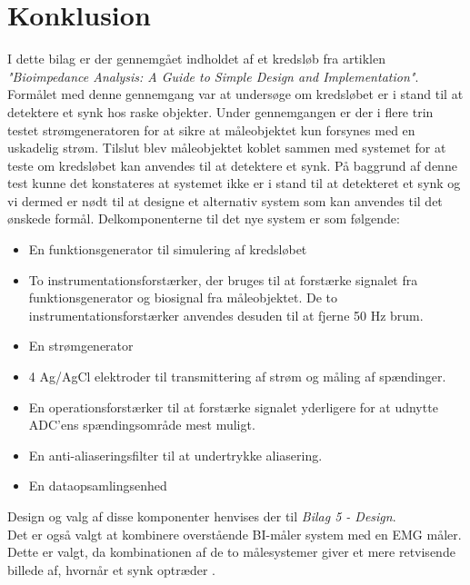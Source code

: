  



\chapter{Konklusion}

I dette bilag er der gennemgået indholdet af et kredsløb fra artiklen \textit{"Bioimpedance Analysis: A Guide to Simple Design and Implementation"}. Formålet med denne gennemgang var at undersøge om kredsløbet er i stand til at detektere et synk hos raske objekter. Under gennemgangen er der i flere trin testet strømgeneratoren for at sikre at måleobjektet kun forsynes med en uskadelig strøm. Tilslut blev måleobjektet koblet sammen med systemet for at teste om kredsløbet kan anvendes til at detektere et synk. På baggrund af denne test kunne det konstateres at systemet ikke er i stand til at detekteret et synk og vi dermed er nødt til at designe et alternativ system som kan anvendes til det ønskede formål. Delkomponenterne til det nye system er som følgende: 

\begin{itemize}
\item En funktionsgenerator til simulering af kredsløbet
\item To instrumentationsforstærker, der bruges til at forstærke signalet fra funktionsgenerator og biosignal fra måleobjektet. De to  instrumentationsforstærker anvendes desuden til at fjerne 50 Hz brum. 
\item En strømgenerator 
\item 4 Ag/AgCl elektroder til transmittering af strøm og måling af spændinger.
\item En operationsforstærker til at forstærke signalet yderligere for at udnytte ADC'ens spændingsområde mest muligt.

\item En anti-aliaseringsfilter til at undertrykke aliasering. 
\item En dataopsamlingsenhed

\end{itemize}

Design og valg af disse komponenter henvises der til \textit{Bilag 5 - Design}. \\
Det er også valgt at kombinere overstående BI-måler system med en EMG måler. Dette er valgt, da kombinationen af de to målesystemer giver et mere retvisende billede af, hvornår et synk optræder \cite{Schultheiss2014}    \citep{ChristensenElisabeth;LundbakStrand2017}. 


